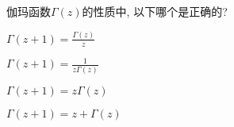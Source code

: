 \documentclass{njustexam}
\begin{document}


\begin{problem}

伽玛函数$\Gamma(z)$的性质中, 以下哪个是正确的? 
\begin{abcd}


\item $\Gamma(z+1) = \frac{\Gamma(z)}{z}$

\item $\Gamma(z+1) = \frac{1}{z\Gamma(z)}$
\item $\Gamma(z+1) = z\Gamma(z)$
\item $\Gamma(z+1) = z+\Gamma(z)$
\end{abcd}
\end{problem}






\end{document}
